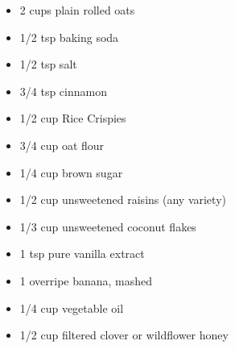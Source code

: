
\RequirePackage{../recipe}






\thispagestyle{firstpage}

\ingredients
\begin{multicols}{2}
\ingredients[Solids]
\begin{itemize}
    \item 2 cups plain rolled oats
    \item 1/2 tsp baking soda
    \item 1/2 tsp salt
    \item 3/4 tsp cinnamon
    \item 1/2 cup Rice Crispies
    \item 3/4 cup oat flour
    \item 1/4 cup brown sugar
    \item 1/2 cup unsweetened raisins (any variety)
    \item 1/3 cup unsweetened coconut flakes
\end{itemize}
\columnbreak
\ingredients[Liquids]
\begin{itemize}
    \item 1 tsp pure vanilla extract
    \item 1 overripe banana, mashed
    \item 1/4 cup vegetable oil
    \item 1/2 cup filtered clover or wildflower honey
\end{itemize}
\end{multicols}

